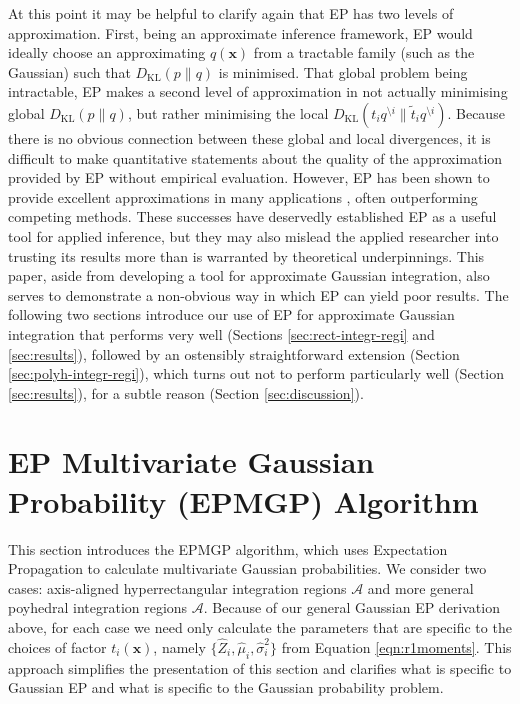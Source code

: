 \documentclass[twoside,11pt]{article}
\def\x{{\mathbf x}}
\def\regionA{\mathcal{A}}
\newcommand{\KL}{\text{KL}}
\newcommand{\wo}{\setminus}
\begin{document}
At this point it may be helpful to clarify again that EP has two levels of approximation.  First, being an approximate inference framework, EP would ideally choose an approximating $q(\x)$ from a tractable family (such as the Gaussian) such that $D_\KL(p\| q)$ is minimised.  That global problem being intractable, EP makes a second level of approximation in not actually minimising global $D_\KL(p\| q)$, but rather minimising the local $D_\KL(t_i q^{\wo i}\| \tilde{t}_i q^{\wo i})$. Because there is no obvious connection between these global and local divergences, it is difficult to make quantitative statements about the quality of the approximation provided by EP without empirical evaluation. However, EP has been shown to provide excellent approximations in many applications \citep{minka01phd, KussRasmussen2005, herbrich2007trueskilltm, stern2009matchbox}, often outperforming competing methods. These successes have deservedly established EP as a useful tool for applied inference, but they may also mislead the applied researcher into trusting its results more than is warranted by theoretical underpinnings. This paper, aside from developing a tool for approximate Gaussian integration, also serves to demonstrate a non-obvious way in which EP can yield poor results. The following two sections introduce our use of EP for approximate Gaussian integration that performs very well (Sections \ref{sec:rect-integr-regi} and \ref{sec:results}), followed by an ostensibly straightforward extension  (Section \ref{sec:polyh-integr-regi}), which turns out not to perform particularly well (Section \ref{sec:results}), for a subtle reason (Section \ref{sec:discussion}).




\section{EP Multivariate Gaussian Probability (EPMGP) Algorithm}
\label{sec:epmgp}

This section introduces the EPMGP algorithm, which uses Expectation Propagation to calculate multivariate Gaussian probabilities.  We consider two cases: axis-aligned hyperrectangular integration regions $\regionA$ and more general poyhedral integration regions $\regionA$.   Because of our general Gaussian EP derivation above, for each case we need only calculate the parameters that are specific to the choices of factor $t_i(\x)$, namely  $\{\hat{Z}_i,\hat{\mu}_i,\hat{\sigma}_i^2\}$ from Equation \ref{eqn:r1moments}.  This approach simplifies the presentation of this section and clarifies what is specific to Gaussian EP and what is specific to the Gaussian probability problem.
\end{document}
